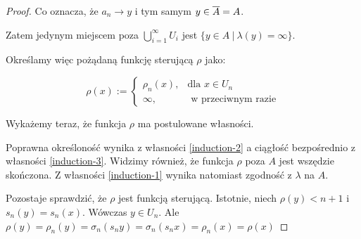 \begin{thm}
\begin{proof}
  Co oznacza, że $a_n \rightarrow y$ i tym samym $y \in \overline{A} = A$.
  
  Zatem jedynym miejscem poza $\bigcup_{i=1}^\infty U_i$ jest $\{y \in A\ |\ \lambda(y) = \infty\}$.
  
  Określamy więc pożądaną funkcję sterującą $\rho$ jako:
  
  $$\rho(x) := 
    \begin{cases}
      \rho_n(x),&\mbox{dla } x \in U_n \\
      \infty,&\mbox{ w przeciwnym razie}
    \end{cases}
  $$
  
  Wykażemy teraz, że funkcja $\rho$ ma postulowane własności.
  
  Poprawna określoność wynika z własności \ref{induction-2} a ciągłość bezpośrednio z własności \ref{induction-3}. Widzimy również, że funkcja $\rho$ poza $A$ jest wszędzie skończona. Z własności \ref{induction-1} wynika natomiast zgodność z $\lambda$ na $A$.
  
  Pozostaje sprawdzić, że $\rho$ jest funkcją sterującą. Istotnie, niech $\rho(y) < n+1$ i $s_n(y) = s_n(x)$. Wówczas $y \in U_n$. Ale $\rho(y) = \rho_n(y) = \sigma_n(s_n y) = \sigma_n(s_n x) = \rho_n(x) = \rho(x)$
\end{proof}
\end{thm}

